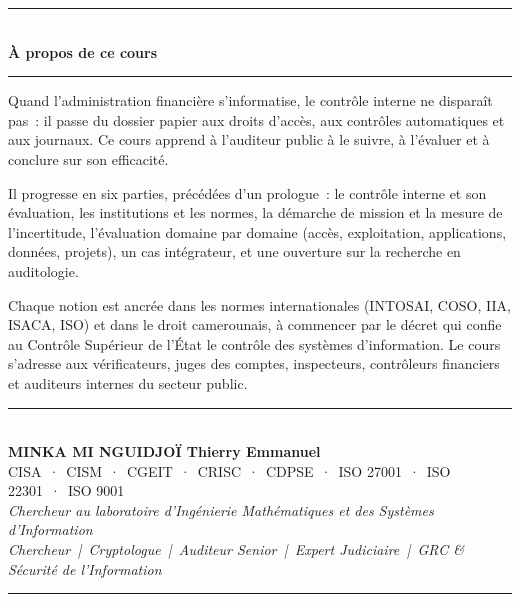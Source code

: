 \documentclass[12pt, twoside, openright, a4paper]{book}
\begin{document}
\vspace*{2.5cm}

\begin{center}
    {\color{CouleurAccent}\rule{0.6\linewidth}{1pt}}\\[1.5ex]
    {\color{white}\Large\bfseries À propos de ce cours}\\[1.5ex]
    {\color{CouleurAccent}\rule{0.6\linewidth}{1pt}}
\end{center}

\vspace{1cm}

\begin{center}
\begin{minipage}{0.75\textwidth}
\color{white!85!gray}
Quand l'administration financière s'informatise, le contrôle interne ne
disparaît pas~: il passe du dossier papier aux droits d'accès, aux
contrôles automatiques et aux journaux. Ce cours apprend à l'auditeur
public à le suivre, à l'évaluer et à conclure sur son efficacité.

\medskip

Il progresse en six parties, précédées d'un prologue~: le contrôle
interne et son évaluation, les institutions et les normes, la démarche de
mission et la mesure de l'incertitude, l'évaluation domaine par domaine
(accès, exploitation, applications, données, projets), un cas intégrateur,
et une ouverture sur la recherche en auditologie.

\medskip

Chaque notion est ancrée dans les normes internationales (INTOSAI, COSO,
IIA, ISACA, ISO) et dans le droit camerounais, à commencer par le décret
qui confie au Contrôle Supérieur de l'État le contrôle des systèmes
d'information. Le cours s'adresse aux vérificateurs, juges des comptes,
inspecteurs, contrôleurs financiers et auditeurs internes du secteur
public.
\end{minipage}
\end{center}

\vfill

\begin{center}
    {\color{CouleurAccent}\rule{0.7\linewidth}{1.2pt}}\\[1.2ex]
    {\color{white}\large\bfseries MINKA MI NGUIDJOÏ Thierry Emmanuel}\\[0.4ex]
    {\color{white!80!gray}\small
        CISA~·~CISM~·~CGEIT~·~CRISC~·~CDPSE~·~ISO 27001~·~ISO 22301~·~ISO 9001}\\[0.3ex]
    {\color{white!70!gray}\footnotesize\itshape
        Chercheur au laboratoire d'Ingénierie Mathématiques et des Systèmes d'Information}\\[0.3ex]
    {\color{white!70!gray}\footnotesize\itshape
        Chercheur~|~Cryptologue~|~Auditeur Senior~|~Expert Judiciaire~|~GRC \& Sécurité de l'Information}\\[1.2ex]
    {\color{CouleurAccent}\rule{0.7\linewidth}{1.2pt}}
\end{center}

\vspace{1cm}

\afterpage{\nopagecolor}
\end{document}
